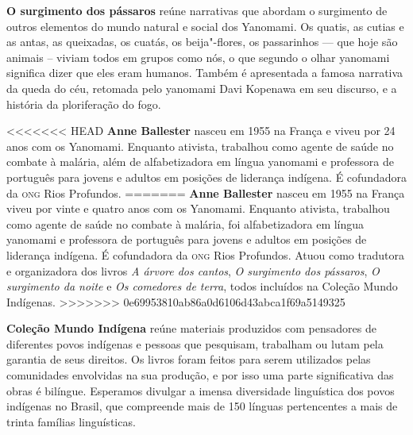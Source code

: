 \textbf{O surgimento dos pássaros} \lipsum[1] reúne narrativas que abordam o surgimento de outros elementos
do mundo natural e social dos Yanomami. Os quatis, as cutias e as antas, as queixadas, os cuatás, os beija"-flores, os passarinhos --- que hoje são animais -- viviam todos em grupos como nós, o que segundo o olhar yanomami significa dizer que eles eram humanos. Também é apresentada a famosa narrativa da queda do céu, retomada pelo yanomami Davi Kopenawa em seu discurso, e a história da ploriferação do fogo. 

<<<<<<< HEAD
\textbf{Anne Ballester} nasceu em 1955 na França e viveu por 24 anos com os Yanomami. Enquanto ativista, trabalhou como agente de saúde no combate à malária, além de alfabetizadora em língua yanomami e professora de português para jovens e adultos em posições de liderança indígena. É cofundadora da \textsc{ong} Rios Profundos. 
=======
\textbf{Anne Ballester} nasceu em 1955 na França viveu por vinte e quatro anos com os Yanomami. 
Enquanto ativista, trabalhou como agente de saúde no combate à malária, foi alfabetizadora em língua 
yanomami e professora de português para jovens e adultos em posições de liderança indígena. É cofundadora da \textsc{ong} Rios Profundos. Atuou como tradutora e organizadora dos livros \textit{A árvore dos cantos}, \textit{O surgimento dos pássaros}, \textit{O surgimento da noite} e \textit{Os comedores de terra}, todos incluídos na Coleção Mundo Indígenas.
>>>>>>> 0e69953810ab86a0d6106d43abca1f69a5149325

\textbf{Coleção Mundo Indígena} reúne materiais produzidos com pensadores de diferentes povos indígenas e pessoas que pesquisam, trabalham ou lutam pela garantia de seus direitos. Os livros foram feitos para serem utilizados pelas comunidades envolvidas na sua produção, e por isso uma parte significativa das obras é bilíngue. Esperamos divulgar a imensa diversidade linguística dos povos indígenas no Brasil, que compreende mais de 150 línguas pertencentes a mais de trinta famílias linguísticas.




